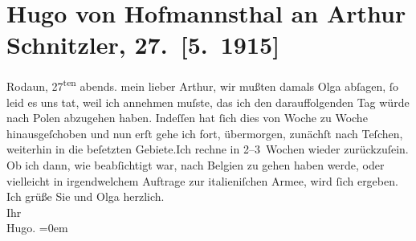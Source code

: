 

         
         \renewcommand{\erwaehntePersonen}{Personen: Hugo von Hofmannsthal, Olga Schnitzler}
         \renewcommand{\erwaehnteOrte}{Orte: Belgien, Italien, Polen, Rodaun, Wien}
         \renewcommand{\erwaehnteWerke}{}
               \section[Hugo von Hofmannsthal an Arthur Schnitzler, 27. {[}5. 1915{]}]{ Hugo von Hofmannsthal an Arthur Schnitzler, 27. {[}5. 1915{]}}\nopagebreak{}\rehead{ }\begin{ledgroupsized}[t]{13cm}\normalsize\beginnumbering \toendnotes[C]{\smallbreak\pagebreak[2]} 
\pstart
           \raggedleft{}{\pb}Rodaun, 27\textsuperscript{ten}{ }abends.\pend
           \pstart
           mein lieber Arthur, wir mußten damals Olga abſagen, ſo leid es uns tat, weil ich annehmen muſste, das
               ich den darauffolgenden Tag würde nach Polen
               abzugehen haben. Indeſſen hat ſich dies von Woche zu Woche hinausgeſchoben und nun
               erſt gehe ich fort, übermorgen, zunächſt nach Teſchen, weiterhin in die beſetzten
                  Gebiete.\hspace*{1.5em}Ich rechne in 2–3 Wochen {\pb}wieder zurückzuſein. Ob ich dann,
               wie beabſichtigt war, nach Belgien zu gehen haben
               werde, oder vielleicht in irgendwelchem Auftrage zur italieniſchen Armee, wird ſich ergeben.\pend
           \pstart
           Ich grüße Sie und Olga herzlich.{\\[\baselineskip]}Ihr{\\[\baselineskip]}\spacefill\mbox{Hugo.}\pend
           \leftskip=0em{}
         
         \endnumbering{}\end{ledgroupsized}  \newcommand{\dateiname}{L02206}\newcommand{\titel}{Hugo von Hofmannsthal an Arthur Schnitzler, 27. [5. 1915]}\newcommand{\editorInnen}{Martin Anton Müller und Gerd-Hermann Susen}
      